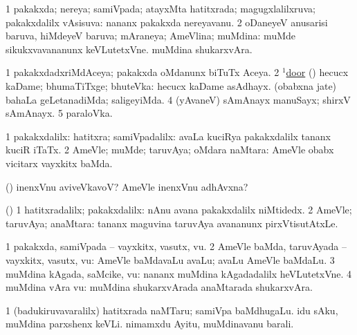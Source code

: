 \bentry
{}
\gl{\gu}
\bmng
\bnum
\num{1} pakakxda; nereya; samiVpada; atayxMta hatitxrada; magugxlalilxruva; pakakxdalilx vAsisuva:  nananx pakakxda nereyavanu. 
\num{2} oDaneyeV anusarisi baruva, hiMdeyeV baruva; mAraneya; AmeVlina; muMdina:  muMde sikukxvavananunx keVLutetxVne.  muMdina shukarxvAra. 
\enum
\emng

\noindent
\gl{\pagu}
\bmng
\bnum
\num{1}  pakakxdadxriMdAceya; pakakxda oMdanunx biTuTx Aceya. 
\num{2}  \hyperref{kandict_d.pdf}{D}{door(1) nuga(10)}{$^1$door}  
  
\banum
{} (\rUpa) hecucx kaDame; bhumaTiTxge; bhuteVka:  hecucx kaDame asAdhayx. 
 (obabxna jate) bahaLa geLetanadiMda; saligeyiMda. 
\eanum
\numie
\num{4} (yAvaneV) sAmAnayx manuSayx; shirxV sAmAnayx. 
\num{5}  paraloVka. 
\enum
\emng
\eentry

\bentry
{}
\gl{\kirxvi}
\bmng
\bnum
\num{1} pakakxdalilx: hatitxra; samiVpadalilx:  avaLa kuciRya pakakxdalilx tananx kuciR iTaTx. 
\num{2} AmeVle; muMde; taruvAya; oMdara naMtara:  AmeVle obabx vicitarx vayxkitx baMda. 
\enum
\emng

\noindent
\gl{\pagu}
\bmng
{}(\rUpa) inenxVnu aviveVkavoV? AmeVle inenxVnu adhAvxna? 
\emng
\eentry

\bentry
{}
\gl{\upa}
\bmng
(\pArxparx) 
\bnum
\num{1} hatitxradalilx; pakakxdalilx:  nAnu avana pakakxdalilx niMtidedx. 
\num{2} AmeVle; taruvAya; anaMtara:  tananx maguvina taruvAya avananunx pirxVtisutAtxLe. 
\enum
\emng
\eentry

\bentry
{}
\gl{\nA}
\bmng
\bnum
\num{1} pakakxda, samiVpada -- vayxkitx, vasutx, \mo vu. 
\num{2} AmeVle baMda, taruvAyada -- vayxkitx, vasutx, \mo vu:  AmeVle baMdavaLu avaLu; avaLu AmeVle baMdaLu. 
\num{3} muMdina kAgada, saMcike, \mo vu:  nananx muMdina kAgadadalilx heVLutetxVne. 
\num{4} muMdina vAra \mo vu:  muMdina shukarxvArada anaMtarada shukarxvAra. 
\enum
\emng

\noindent
\gl{\pagu}
\bmng
{} 
\bnum
\num{1} (badukiruvavaralilx) hatitxrada naMTaru; samiVpa baMdhugaLu. 
  
\banum
{} idu sAku, muMdina parxshenx keVLi. 
 nimamxdu Ayitu, muMdinavanu barali. 
\eanum
\numie
\enum
\emng
\eentry

